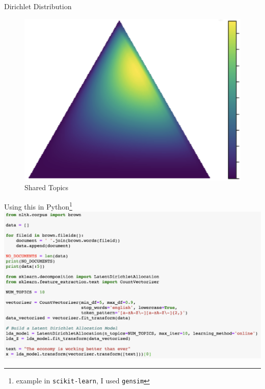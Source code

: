 \documentclass[10pt]{beamer}
\begin{document}
\begin{frame}{Dirichlet Distribution}
\begin{multicols}{3}
    \columnbreak

  \hfill
    \begin{figure}
  \includegraphics[width=\columnwidth]{shared.png}
  \caption{Shared Topics}
  \end{figure}

  \end{multicols}

\end{frame}

\begin{frame}{Using this in Python\footnote{example in \texttt{scikit-learn}, I used \texttt{gensim}}}
  \includegraphics[width=\textwidth]{./implement.png}
\end{frame}
\end{document}
